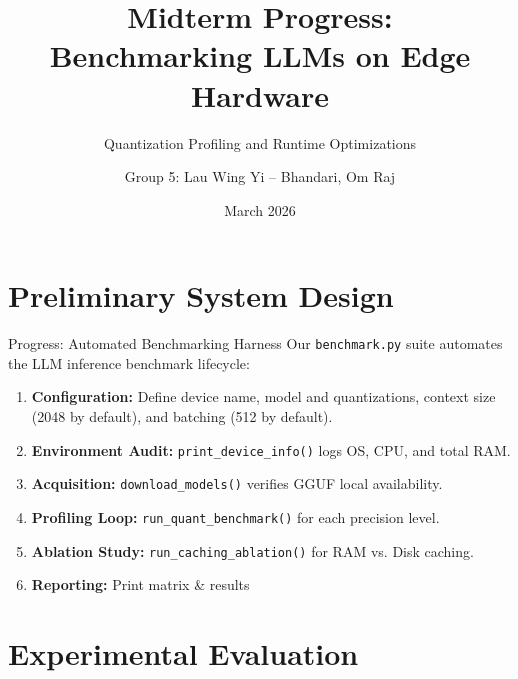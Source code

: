 \documentclass[10pt]{beamer}
\title{Midterm Progress:\\
Benchmarking LLMs on Edge Hardware}
\subtitle{Quantization Profiling and Runtime Optimizations}
\author{Group 5: Lau Wing Yi -- Bhandari, Om Raj}
\date{March 2026}
\begin{document}
\begin{frame}
    \titlepage
\end{frame}

\section{Preliminary System Design}

\begin{frame}{Progress: Automated Benchmarking Harness}
    Our \texttt{benchmark.py} suite automates the LLM inference benchmark lifecycle:
    \begin{enumerate}
        \item \textbf{Configuration:} Define device name, model and quantizations, context size (2048 by default), and batching (512 by default).
        \item \textbf{Environment Audit:} \texttt{print\_device\_info()} logs OS, CPU, and total RAM.
        \item \textbf{Acquisition:} \texttt{download\_models()} verifies GGUF local availability.
        \item \textbf{Profiling Loop:} \texttt{run\_quant\_benchmark()} for each precision level.
        \item \textbf{Ablation Study:} \texttt{run\_caching\_ablation()} for RAM vs. Disk caching.
        \item \textbf{Reporting:} Print matrix \& results
    \end{enumerate}
\end{frame}

\section{Experimental Evaluation}
\end{document}
